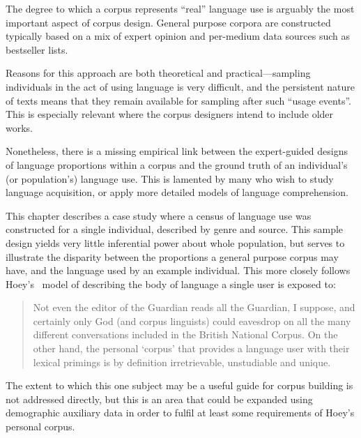 The degree to which a corpus represents ``real'' language use is arguably the most important aspect of corpus design.  General purpose corpora are constructed typically based on a mix of expert opinion and per-medium data sources such as bestseller lists.


Reasons for this approach are both theoretical and practical---sampling individuals in the act of using language is very difficult, and the persistent nature of texts means that they remain available for sampling after such ``usage events''.  This is especially relevant where the corpus designers intend to include older works.

Nonetheless, there is a missing empirical link between the expert-guided designs of language proportions within a corpus and the ground truth of an individual's (or population's) language use.  This is lamented by many who wish to study language acquisition, or apply more detailed models of language comprehension.

This chapter describes a case study where a census of language use was constructed for a single individual, described by genre and source.  This sample design yields very little inferential power about whole population, but serves to illustrate the disparity between the proportions a general purpose corpus may have, and the language used by an example individual.  This more closely follows Hoey's~\cite[pxx]{hoey2005lexical} model of describing the body of language a single user is exposed to:

\begin{quote}
Not even the editor of the Guardian reads all the Guardian, I suppose, and certainly only God (and corpus linguists) could eavesdrop on all the many different conversations included in the British National Corpus.  On the other hand, the personal `corpus' that provides a language user with their lexical primings is by definition irretrievable, unstudiable and unique.
\end{quote}

The extent to which this one subject may be a useful guide for corpus building is not addressed directly, but this is an area that could be expanded using demographic auxiliary data in order to fulfil at least some requirements of Hoey's personal corpus.

